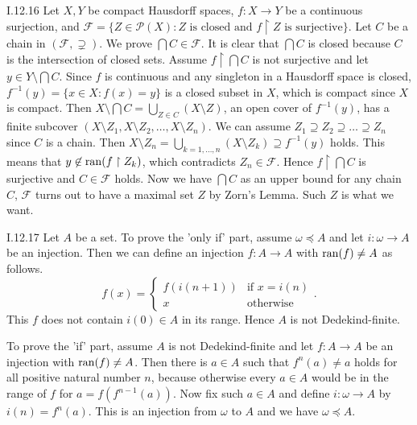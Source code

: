 \documentclass[12pt]{article}
\begin{document}
\begin{customthm}{I.12.16}
  Let $X,Y$ be compact Hausdorff spaces, $f:X\rightarrow Y$ be a continuous surjection, and $\mathcal{F}=\{Z\in\mathcal{P}(X):Z\text{ is closed and }f\upharpoonright Z\text{ is surjective}\}$. Let $C$ be a chain in $(\mathcal{F},\supsetneq)$. We prove $\bigcap C\in\mathcal{F}$. It is clear that $\bigcap C$ is closed because $C$ is the intersection of closed sets. Assume $f\upharpoonright\bigcap C$ is not surjective and let $y\in Y\setminus\bigcap C$. Since $f$ is continuous and any singleton in a Hausdorff space is closed, $f^{-1}(y)=\{x\in X:f(x)=y\}$ is a closed subset in $X$, which is compact since $X$ is compact. Then $X\setminus\bigcap C=\bigcup_{Z\in C}(X\setminus Z)$, an open cover of $f^{-1}(y)$, has a finite subcover $(X\setminus Z_1,X\setminus Z_2,\ldots,X\setminus Z_n)$. We can assume $Z_1\supseteq Z_2\supseteq\ldots\supseteq Z_n$ since $C$ is a chain. Then $X\setminus Z_n=\bigcup_{k=1,\ldots,n}(X\setminus Z_k)\supseteq f^{-1}(y)$ holds. This means that $y\not\in\mathop{\mathrm{ran}}(f\upharpoonright Z_k)$, which contradicts $Z_n\in\mathcal{F}$. Hence $f\upharpoonright\bigcap C$ is surjective and $C\in\mathcal{F}$ holds. Now we have $\bigcap C$ as an upper bound for any chain $C$, $\mathcal{F}$ turns out to have a maximal set $Z$ by Zorn's Lemma. Such $Z$ is what we want.
\end{customthm}

\begin{customthm}{I.12.17}
  Let $A$ be a set. To prove the 'only if' part, assume $\omega\preccurlyeq A$ and let $i:\omega\rightarrow A$ be an injection. Then we can define an injection $f:A\rightarrow A$ with $\mathop{\mathrm{ran}}(f)\neq A$ as follows.
  \[
    f(x)=
    \begin{cases}
      f(i(n+1)) & \text{if } x=i(n) \\
      x & \text{otherwise}
    \end{cases}.
  \]
  This $f$ does not contain $i(0)\in A$ in its range. Hence $A$ is not Dedekind-finite.

  To prove the 'if' part, assume $A$ is not Dedekind-finite and let $f:A\rightarrow A$ be an injection with $\mathop{\mathrm{ran}}(f)\neq A$. Then there is $a\in A$ such that $f^n(a)\neq a$ holds for all positive natural number $n$, because otherwise every $a\in A$ would be in the range of $f$ for $a=f(f^{n-1}(a))$. Now fix such $a\in A$ and define $i:\omega\rightarrow A$ by $i(n)=f^n(a)$. This is an injection from $\omega$ to $A$ and we have $\omega\preccurlyeq A$.
\end{customthm}
\end{document}
